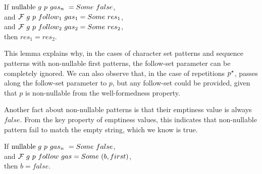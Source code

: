 \begin{lemma}
If $\text{nullable}\ g\ p\ gas_n\ = Some\ false$, \\
and $\mathcal{F}{}\ g\ p\ follow_1\ gas_1 = Some\ res_1$, \\
and $\mathcal{F}{}\ g\ p\ follow_2\ gas_2 = Some\ res_2$, \\
then $res_1 = res_2$.
\end{lemma}

This lemma explains why, in the cases of character set patterns
and sequence patterns with non-nullable first patterns,
the follow-set parameter can be completely ignored.
We can also observe that, in the case of repetitions $p^\star$,
\lpeg{} passes along the follow-set parameter to $p$,
but any follow-set could be provided,
given that $p$ is non-nullable from the well-formedness property.

Another fact about non-nullable patterns
is that their emptiness value is always $false$.
From the key property of emptiness values,
this indicates that non-nullable pattern
fail to match the empty string,
which we know is true.

\begin{lemma}
If $\text{nullable}\ g\ p\ gas_n\ = Some\ false$, \\
and $\mathcal{F}{}\ g\ p\ follow\ gas = Some\ (b, first)$, \\
then $b = false$.
\end{lemma}




